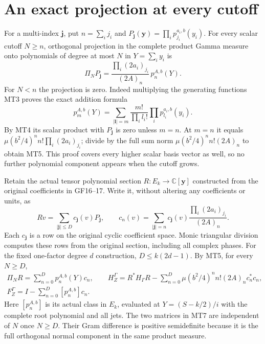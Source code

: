 \documentclass[11pt]{article}
\newcommand{\C}{\mathbb C}\newcommand{\R}{\mathbb R}
\begin{document}
\section{An exact projection at every cutoff}
For a multi-index $\mathbf j$, put $n=\sum_i j_i$ and
$P_{\mathbf j}(\mathbf y)=\prod_i p_{j_i}^{a_i,b}(y_i)$.
For every scalar cutoff $N\ge n$, orthogonal projection in the complete
product Gamma measure onto polynomials of degree at most $N$ in
$Y=\sum_i y_i$ is
\begin{equation}\tag{MT5}\boxed{
 \Pi_N P_{\mathbf j}
 =\frac{\prod_i(2a_i)_{j_i}}{(2A)_n}\,p_n^{A,b}(Y).}
\end{equation}
For $N<n$ the projection is zero. Indeed multiplying the generating
functions MT3 proves the exact addition formula
\[
 p_m^{A,b}(Y)=\sum_{|\mathbf l|=m}
 \frac{m!}{\prod_i l_i!}\prod_i p_{l_i}^{a_i,b}(y_i).
\]
By MT4 its scalar product with $P_{\mathbf j}$ is zero unless $m=n$.
At $m=n$ it equals
$\mu(b^2/4)^n n!\prod_i(2a_i)_{j_i}$; divide by the full sum norm
$\mu(b^2/4)^n n!(2A)_n$ to obtain MT5. This proof covers every higher
scalar basis vector as well, so no further polynomial component
appears when the cutoff grows.

Retain the actual tensor polynomial section $R:E_k\to\C[\mathbf y]$
constructed from the original coefficients in GF16--17. Write it,
without altering any coefficients or units, as
\begin{equation}\tag{MT6}
 Rv=\sum_{|\mathbf j|\le D}c_{\mathbf j}(v)P_{\mathbf j},\qquad
 c_n(v)=\sum_{|\mathbf j|=n}
       c_{\mathbf j}(v)\frac{\prod_i(2a_i)_{j_i}}{(2A)_n}.
\end{equation}
Each $c_{\mathbf j}$ is a row on the original cyclic coefficient
space. Monic triangular division computes these rows from the original
section, including all complex phases. For the fixed one-factor degree
$d$ construction, $D\le k(2d-1)$.
By MT5, for every $N\ge D$,
\begin{equation}\tag{MT7}\boxed{\begin{gathered}
 \Pi_NR=\sum_{n=0}^D p_n^{A,b}(Y)c_n,\qquad
 H_Z^\Gamma=R^*H_\Gamma R-
 \sum_{n=0}^D\mu(b^2/4)^n n!(2A)_n c_n^*c_n,\\
 F_Z^\Gamma=I-\sum_{n=0}^D[p_n^{A,b}]c_n.
\end{gathered}}\end{equation}
Here $[p_n^{A,b}]$ is its actual class in $E_k$, evaluated at
$Y=(S-k/2)/i$ with the complete root polynomial and all jets.
The two matrices in MT7 are independent of $N$ once $N\ge D$.
Their Gram difference is positive semidefinite because it is the full
orthogonal normal component in the same product measure.
\end{document}
